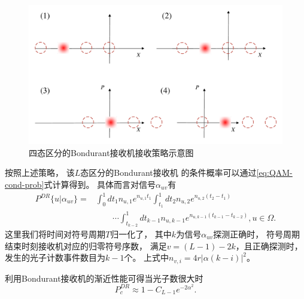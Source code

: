 \begin{figure}
\centering
  \includegraphics[width=\textwidth]{figures/chap3/Q-Bondurant-displacemet-strategy}
  \caption{四态区分的Bondurant接收机接收策略示意图}
  \label{fig:Q-Bondurant-displacemet-strategy}
\end{figure}

按照上述策略，
该$L$态区分的Bondurant接收机
的条件概率可以通过\ref{eq:QAM-cond-prob}式计算得到。
具体而言对信号$\alpha_{uv}$有
\begin{equation}
\begin{split}
P^{DR}\{u|\alpha_{uv}\} = & \int_0^1 dt_1 n_{u,1} e^{n_{u,1} t_1} \int_{t_1}^1 dt_2 n_{u,2} e^{n_{u,2} (t_2-t_1)}   \\
                          &\qquad \cdots \int_{t_{k-2}}^1 dt_{k-1} n_{u,k-1} e^{n_{u,k-1} (t_{k-1}-t_{k-2})}, u \in \Omega.
\end{split}
\label{eq:DR-cond-p}
\end{equation}
这里我们将时间对符号周期$T$归一化了，
其中$k$为信号$\alpha_{uv}$探测正确时，
符号周期结束时刻接收机对应的归零符号序数，
满足$v = (L-1) - 2k$，且正确探测时，发生的光子计数事件数目为$k-1$个。
上式中$n_{v,i} = 4r|\alpha(k-i)|^2 $。

利用Bondurant接收机的渐近性能可得当光子数很大时
\begin{equation}
P_c^{DR} \approx 1 - C_{L-1} e^{-2\alpha^2}.
\label{eq:QAM-Hybrid-approx-2}
\end{equation}

